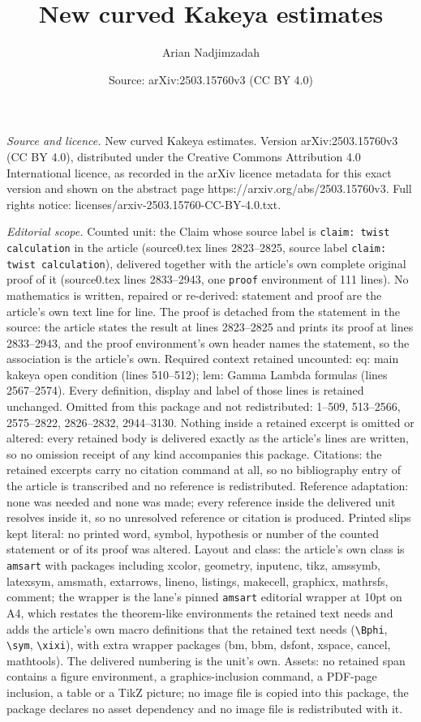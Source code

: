 \documentclass[10pt,a4paper]{amsart}
\title[New curved Kakeya estimates]{New curved Kakeya estimates}
\author{Arian Nadjimzadah}
\date{Source: arXiv:2503.15760v3 (CC BY 4.0)}
\begin{document}
\maketitle

\noindent\emph{Source and licence.} New curved Kakeya estimates. Version arXiv:2503.15760v3 (CC BY 4.0), distributed under the Creative Commons Attribution 4.0 International licence, as recorded in the arXiv licence metadata for this exact version and shown on the abstract page https://arxiv.org/abs/2503.15760v3. Full rights notice: licenses/arxiv-2503.15760-CC-BY-4.0.txt.\par\smallskip

\noindent\textit{Editorial scope.} Counted unit: the Claim whose source label is \texttt{claim: twist calculation} in the article (source0.tex lines 2823--2825, source label \texttt{claim: twist calculation}), delivered together with the article's own complete original proof of it (source0.tex lines 2833--2943, one \texttt{proof} environment of 111 lines). No mathematics is written, repaired or re-derived: statement and proof are the article's own text line for line. The proof is detached from the statement in the source: the article states the result at lines 2823--2825 and prints its proof at lines 2833--2943, and the proof environment's own header names the statement, so the association is the article's own. Required context retained uncounted: eq: main kakeya open condition (lines 510--512); lem: Gamma Lambda formulas (lines 2567--2574). Every definition, display and label of those lines is retained unchanged. Omitted from this package and not redistributed: 1--509, 513--2566, 2575--2822, 2826--2832, 2944--3130. Nothing inside a retained excerpt is omitted or altered: every retained body is delivered exactly as the article's lines are written, so no omission receipt of any kind accompanies this package. Citations: the retained excerpts carry no citation command at all, so no bibliography entry of the article is transcribed and no reference is redistributed. Reference adaptation: none was needed and none was made; every reference inside the delivered unit resolves inside it, so no unresolved reference or citation is produced. Printed slips kept literal: no printed word, symbol, hypothesis or number of the counted statement or of its proof was altered. Layout and class: the article's own class is \texttt{amsart} with packages including xcolor, geometry, inputenc, tikz, amssymb, latexsym, amsmath, extarrows, lineno, listings, makecell, graphicx, mathrsfs, comment; the wrapper is the lane's pinned \texttt{amsart} editorial wrapper at 10pt on A4, which restates the theorem-like environments the retained text needs and adds the article's own macro definitions that the retained text needs (\texttt{\textbackslash Bphi}, \texttt{\textbackslash sym}, \texttt{\textbackslash xixi}), with extra wrapper packages (bm, bbm, dsfont, xspace, cancel, mathtools). The delivered numbering is the unit's own. Assets: no retained span contains a figure environment, a graphics-inclusion command, a PDF-page inclusion, a table or a TikZ picture; no image file is copied into this package, the package declares no asset dependency and no image file is redistributed with it. 
\end{document}
